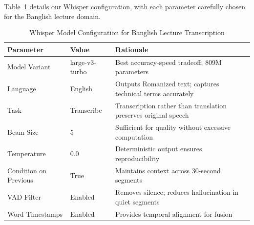Table~\ref{tab:whisper_config} details our Whisper configuration, with each parameter carefully chosen for the Banglish lecture domain.

\begin{table}[h]
\centering
\caption{Whisper Model Configuration for Banglish Lecture Transcription}
\label{tab:whisper_config}
\begin{tabular}{|l|l|p{6.5cm}|}
\hline
\textbf{Parameter} & \textbf{Value} & \textbf{Rationale} \\
\hline
Model Variant & large-v3-turbo & Best accuracy-speed tradeoff; 809M parameters \\
\hline
Language & English & Outputs Romanized text; captures technical terms accurately \\
\hline
Task & Transcribe & Transcription rather than translation preserves original speech \\
\hline
Beam Size & 5 & Sufficient for quality without excessive computation \\
\hline
Temperature & 0.0 & Deterministic output ensures reproducibility \\
\hline
Condition on Previous & True & Maintains context across 30-second segments \\
\hline
VAD Filter & Enabled & Removes silence; reduces hallucination in quiet segments \\
\hline
Word Timestamps & Enabled & Provides temporal alignment for fusion \\
\hline
\end{tabular}
\end{table}

%
%

